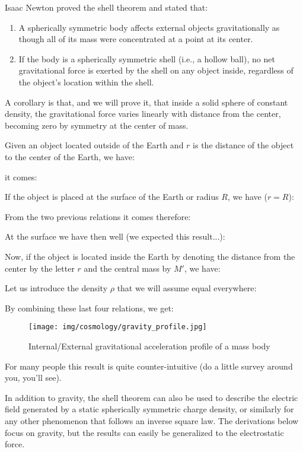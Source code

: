 	Isaac Newton proved the shell theorem and stated that:
	\begin{enumerate}
		\item A spherically symmetric body affects external objects gravitationally as though all of its mass were concentrated at a point at its center.
		\item If the body is a spherically symmetric shell (i.e., a hollow ball), no net gravitational force is exerted by the shell on any object inside, regardless of the object's location within the shell.
	\end{enumerate}
	A corollary is that, and we will prove it, that inside a solid sphere of constant density, the gravitational force varies linearly with distance from the center, becoming zero by symmetry at the center of mass.
	
	Given an object located outside of the Earth and $r$ is the distance of the object to the center of the Earth, we have:
	
	it comes:
	
	If the object is placed at the surface of the Earth or radius $R$, we have ($r=R$):
	
	From the two previous relations it comes therefore:
	
	At the surface we have then well (we expected this result...):
	
	Now, if the object is located inside the Earth by denoting the distance from the center by the letter $r$ and the central mass by $M'$, we have:
	
	Let us introduce the density $\rho$ that we will assume equal everywhere:
	
	By combining these last four relations, we get:
	
	\begin{figure}[H]
		\centering
		\texttt{[image: img/cosmology/gravity\_profile.jpg]}	
		\caption{Internal/External gravitational acceleration profile of a mass body}
	\end{figure}

	For many people this result is quite counter-intuitive (do a little survey around you, you'll see).
	
	\begin{tcolorbox}[title=Remark,colframe=black,arc=10pt]
	In addition to gravity, the shell theorem can also be used to describe the electric field generated by a static spherically symmetric charge density, or similarly for any other phenomenon that follows an inverse square law. The derivations below focus on gravity, but the results can easily be generalized to the electrostatic force. 
	\end{tcolorbox}
	
